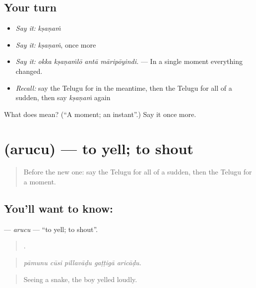 \subsection*{Your turn}
\begin{itemize}
\raggedright
  \item \emph{Say it:} \emph{kṣaṇaṁ}
  \item \emph{Say it:} \emph{kṣaṇaṁ}, once more
  \item \emph{Say it:} \emph{okka kṣaṇaṁlō antā māripōyindi.} — In a single moment everything changed.
  \item \emph{Recall:} say the Telugu for in the meantime, then the Telugu for all of a sudden, then say \emph{kṣaṇaṁ} again
\end{itemize}

\begin{tcolorbox}[breakable,colback=teal!4,colframe=teal!35!black,title={Before you move on}]
What does  mean? (\textquotedblleft{}A moment; an instant\textquotedblright{}.) Say it once more.
\end{tcolorbox}
\section[\texorpdfstring{\te{అరుచు} (arucu)}{అరుచు (arucu)}]{ (arucu) — to yell; to shout}

\label{lesson:TE-C332-arucu}



\begin{quote}
Before the new one: say the Telugu for all of a sudden, then the Telugu for a moment.
\end{quote}

\subsection*{You'll want to know: }
\textbf{} — \emph{arucu} — \textquotedblleft{}to yell; to shout\textquotedblright{}.

\begin{quote}
    .
\end{quote}

\begin{quote}
\emph{pāmunu cūsi pillavāḍu gaṭṭigā aricāḍu.}
\end{quote}

\begin{quote}
Seeing a snake, the boy yelled loudly.
\end{quote}

